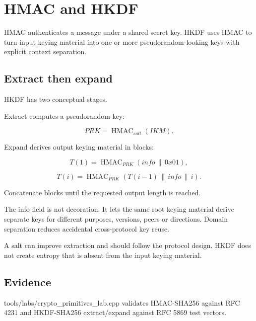 \hypertarget{appendix-50af792c9da7}{}\label{referencestart:appendix-50af792c9da7}
\section{HMAC and HKDF}\label{appendix-50af792c9da7-hmac-and-hkdf}

\hypertarget{appendix-50af792c9da7-hmac-and-hkdf}{}

HMAC authenticates a message under a shared secret key. HKDF uses HMAC to turn input keying material into one or more pseudorandom-looking keys with explicit context separation.

\subsection{Extract then expand}\label{appendix-50af792c9da7-extract-then-expand}

\hypertarget{appendix-50af792c9da7-extract-then-expand}{}

HKDF has two conceptual stages.

Extract computes a pseudorandom key:

\[
PRK=\operatorname{HMAC}_{salt}(IKM).
\]

Expand derives output keying material in blocks:

\[
T(1)=\operatorname{HMAC}_{PRK}(info\,\|\,0x01),
\]

\[
T(i)=\operatorname{HMAC}_{PRK}(T(i-1)\,\|\,info\,\|\,i).
\]

Concatenate blocks until the requested output length is reached.

The info field is not decoration. It lets the same root keying material derive separate keys for different purposes, versions, peers or directions. Domain separation reduces accidental cross-protocol key reuse.

A salt can improve extraction and should follow the protocol design. HKDF does not create entropy that is absent from the input keying material.

\subsection{Evidence}\label{appendix-50af792c9da7-evidence}

\hypertarget{appendix-50af792c9da7-evidence}{}

tools/labs/crypto\_primitives\_lab.cpp validates HMAC-SHA256 against RFC 4231 and HKDF-SHA256 extract/expand against RFC 5869 test vectors.

